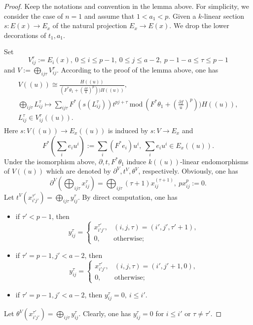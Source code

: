 \documentclass[12pt, a4paper]{article}
\begin{document}
\begin{proof}
Keep the notations and convention in the lemma above. For simplicity, we consider the case of $n=1$ and assume that $1<a_1<p$. Given a $k$-linear section $s:E(x)\to E_x$ of the natural projection $E_x\to E(x)$. We drop the lower decorations of $t_1,a_1$. 

Set
$$
V^\tau_{ij}:=E_i(x),~0\leq i\leq p-1,~0\leq j\leq a-2,~p-1-a\leq\tau\leq p-1
$$
and $V:=\bigoplus_{ij\tau}V_{ij}^\tau$.
According to the proof of the lemma above, one has
\begin{eqnarray}\label{iso to V}
\begin{array}{c}
V((u))\cong\frac{H((u))}{(F^*\theta_1+(\frac{\partial f}{u})^p))H((u))},\\
\bigoplus_{ij\tau}L_{ij}^\tau\mapsto\sum_{ij\tau}F^*(s(L_{ij}^\tau))t^{pj+\tau}~\mathrm{mod}~(F^*\theta_1+(\frac{\partial f}{u})^p))H((u)),\\
L_{ij}^\tau\in V_{ij}^\tau((u)).
\end{array}
\end{eqnarray}
Here $s:V((u))\to E_x((u))$ is induced by $s:V\to E_x$ and
$$
F^*(\sum_i e_iu^i):=\sum_i(F^*e_i)u^i,~\sum_i e_iu^i\in E_x((u)).
$$
Under the isomorphism above, $\partial, t, F^*\theta_1$ induce $k((u))$-linear endomorphisms of $V((u))$ which are denoted by $\partial^V, t^V,\theta^V$, respectively. Obviously, one has
$$
\partial^V(\bigoplus_{ij\tau}x_{ij}^\tau)=\bigoplus_{ij\tau}(\tau+1)x_{ij}^{(\tau+1)},~px^p_{ij}:=0.
$$
Let $t^V(x_{i'j'}^{\tau'})=\bigoplus_{ij\tau}y_{ij}^\tau$. By direct computation, one has
\begin{itemize}
\item if $\tau'<p-1$, then
$$
y_{ij}^\tau=\left\{
\begin{matrix}
x_{i'j'}^{\tau'},&(i,j,\tau)=(i',j',\tau'+1),\\
0,&\mathrm{otherwise};
\end{matrix}
\right.
$$
\item if $\tau'=p-1,j'<a-2$, then
$$
y_{ij}^\tau=\left\{\begin{matrix}
x_{i'j'}^{\tau'},&(i,j,\tau)=(i',j'+1,0),\\
0,&\mathrm{otherwise};
\end{matrix}\right.
$$
\item if $\tau'=p-1,j'<a-2$, then $y_{ij}^\tau=0,~i\leq i'$.
\end{itemize}
Let $\theta^V(x_{i'j'}^{\tau'})=\bigoplus_{ij\tau}y_{ij}^\tau$. Clearly, one has $y_{ij}^\tau=0$ for $i\leq i'$ or $\tau\neq\tau'$.


\end{proof}
\end{document}
